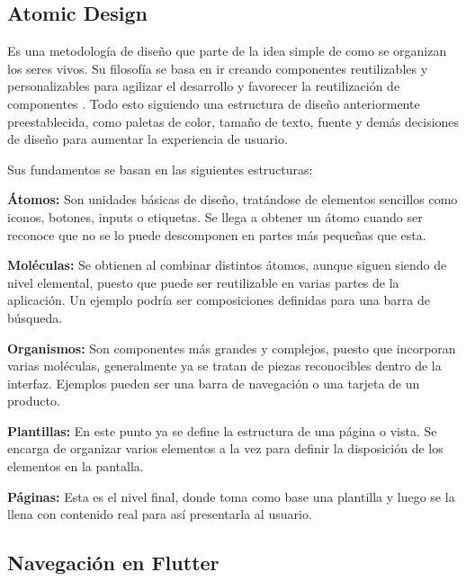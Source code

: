 \subsection{Atomic Design}
Es una metodología de diseño que parte de la idea simple de como se organizan los seres vivos. Su filosofía se basa en ir creando componentes reutilizables y personalizables para agilizar el desarrollo y favorecer la reutilización de componentes \parencite{Garca2024}. Todo esto siguiendo una estructura de diseño anteriormente preestablecida, como paletas de color, tamaño de texto, fuente y demás decisiones de diseño para aumentar la experiencia de usuario.

Sus fundamentos se basan en las siguientes estructuras:

\textbf{Átomos:} Son unidades básicas de diseño, tratándose de elementos sencillos como iconos, botones, inputs o etiquetas. Se llega a obtener un átomo cuando ser reconoce que no se lo puede descomponen en partes más pequeñas que esta.

\textbf{Moléculas:} Se obtienen al combinar distintos átomos, aunque siguen siendo de nivel elemental, puesto que puede ser reutilizable en varias partes de la aplicación. Un ejemplo podría ser composiciones definidas para una barra de búsqueda.

\textbf{Organismos:} Son componentes más grandes y complejos, puesto que incorporan varias moléculas, generalmente ya se tratan de piezas reconocibles dentro de la interfaz. Ejemplos pueden ser una barra de navegación o una tarjeta de un producto.

\textbf{Plantillas:} En este punto ya se define la estructura de una página o vista. Se encarga de organizar varios elementos a la vez para definir la disposición de los elementos en la pantalla.

\textbf{Páginas:} Esta es el nivel final, donde toma como base una plantilla y luego se la llena con contenido real para así presentarla al usuario.

\subsection{Navegación en Flutter}

